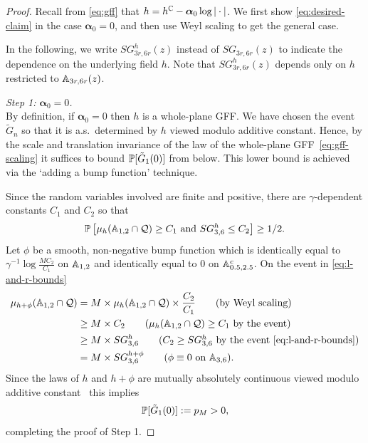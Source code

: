 \documentclass[12pt]{amsart}
\numberwithin{equation}{section}
\newcommand{\SGrho}[2]{\hyperref[eq:alternate-size-2]{SG_{#1}(#2)}}
\begin{document}
	
	\begin{proof}
		
		Recall from \eqref{eq:gff} that $h = h^\C - \boldsymbol{\alpha}_0 \log |\cdot|$. 
		We first show \eqref{eq:desired-claim} in the case $\boldsymbol{\alpha}_0 = 0$, 
		and then use Weyl scaling to get the general case. 
		
		
		
		
		
		In the following, we write $SG_{3r ,6r}^h(z)$ instead of $\SGrho{3r,6r}{z}$ to indicate the dependence on the underlying field $h$. 
		Note that $SG^h_{3r ,6r }(z)$ depends only on $h$ restricted to $\A_{3r, 6r}(z)$. 
		
		{\it Step 1: $\boldsymbol{\alpha}_0 = 0$.} \\
		By definition, if $\boldsymbol{\alpha}_0 = 0$ then $h$ is a whole-plane GFF.
		We have chosen the event $\tilde G_n$ so that it is a.s.\ determined by $h $ viewed modulo additive constant. Hence, by the scale and translation invariance of the law of the whole-plane GFF~\eqref{eq:gff-scaling} it suffices to bound $\P[\tilde G_1(0)]$ from below. This lower bound is achieved via the `adding a bump function' technique. 
		
		Since the random variables involved are finite and positive, there are $\gamma$-dependent constants $C_1$ and $C_2$ so that
		\begin{equation} \label{eq:l-and-r-bounds}
		\P\left[\mu_h(\A_{1,2} \cap \mathcal Q) \geq C_1 \mbox{ and }  SG^h_{3,6} \leq C_2\right] \geq 1/2.
		\end{equation}
		Let $\phi$ be a smooth, non-negative bump function 
		which is identically equal to $\gamma^{-1} \log \frac{M C_2}{C_1}$ on $\A_{1,2}$ and identically equal to 0 on $\A_{0.5,2.5}^c$. On the event in \eqref{eq:l-and-r-bounds}
		\begin{align*}
		\mu_{h+\phi}(\A_{1,2} \cap \mathcal Q) &= M \times \mu_h(\A_{1,2} \cap \mathcal Q) \times  \frac{C_2}{C_1} \qquad \mbox{(by Weyl scaling)} \\
		&\geq M \times C_2 \qquad \mbox{($\mu_h(\A_{1,2} \cap \mathcal Q) \geq C_1$ by the event)} \\
		&\geq M \times SG^h_{3,6}  \qquad \mbox{($ C_2 \geq SG^h_{3,6}$ by the event \eqref{eq:l-and-r-bounds})} \\
		&= M \times SG^{h+\phi}_{3,6} \qquad \mbox{($\phi \equiv 0$ on $\A_{3, 6}$)}.
		\end{align*}	
		Since the laws of $h$ and $h+\phi$ are mutually absolutely continuous viewed modulo additive constant~\cite[Proposition 2.9]{miller2017imaginary} this implies
		\[
		\P[\tilde G_1(0)] := p_M > 0,
		\]		
		completing the proof of Step 1.
		

\end{proof}
\end{document}
